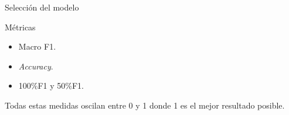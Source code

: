 \documentclass{beamer}
\begin{document}
\begin{frame}{Selección del modelo}

    \pause
    \begin{block}{Métricas}
        \begin{itemize}
            \pause
            \item Macro F1.
            \pause
            \item \emph{Accuracy}.
            \pause
            \item 100\%F1 y 50\%F1.
        \end{itemize}
    \end{block}

    \pause
    Todas estas medidas oscilan entre 0 y 1 donde 1 es el mejor resultado posible.

\end{frame}
\end{document}
